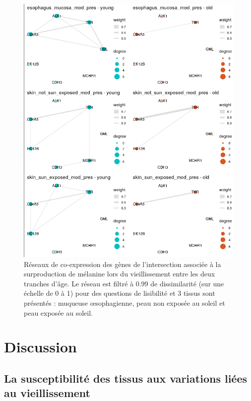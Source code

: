 \begin{figure}[p]
    \centering
    \includegraphics[width=1\textwidth]{img/chap2/chap2_graphs_intersection_melanine.png}
    \caption{Réseaux de co-expression des gènes de l'intersection associée à la surproduction de mélanine lors du vieillissement entre les deux tranches d'âge. Le réseau est filtré à 0.99 de dissimilarité (sur une échelle de 0 à 1) pour des questions de lisibilité et 3 tissus sont présentés : muqueuse œsophagienne, peau non exposée au soleil et peau exposée au soleil.}
    \label{figure:graphs_intersection_melanine}
\end{figure}



\section{Discussion}

\subsection{La susceptibilité des tissus aux variations liées au vieillissement}

